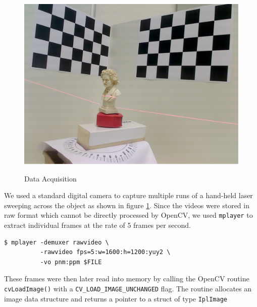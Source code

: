 \begin{figure}[ht!]
\centering
\includegraphics[width=0.5\linewidth]{figures/introduction}
\label{figure:acquisition}
\caption{Data Acquisition}
\end{figure}

We used a standard digital camera to capture multiple runs of a hand-held laser sweeping across the object as shown in figure \ref{figure:acquisition}. Since the videos were stored in raw format which cannot be directly processed by OpenCV, we used \texttt{mplayer} to extract individual frames at the rate of 5 frames per second.

\begin{verbatim}
$ mplayer -demuxer rawvideo \
          -rawvideo fps=5:w=1600:h=1200:yuy2 \
          -vo pnm:ppm $FILE	
\end{verbatim}

These frames were then later read into memory by calling the OpenCV routine \texttt{cvLoadImage()} with a \texttt{CV\_LOAD\_IMAGE\_UNCHANGED} flag. The routine allocates an image data structure and returns a pointer to a struct of type \texttt{IplImage}

